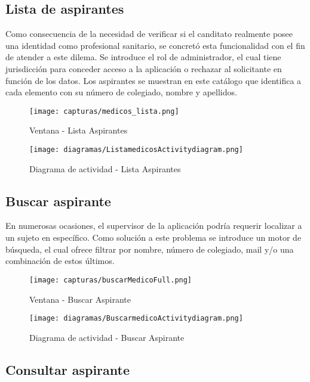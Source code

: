 \documentclass[11pt,spanish,
		listoftables,listoffigures]
		{tfgplantilla}
\begin{document}
\subsection {Lista de aspirantes}

Como consecuencia de la necesidad de verificar si el canditato realmente posee una identidad como profesional sanitario, se concretó esta funcionalidad con el fin de atender a este dilema. Se introduce el rol de administrador, el cual tiene jurisdicción para conceder acceso a la aplicación o rechazar al solicitante en función de los datos. Los aspirantes se muestran en este catálogo que identifica a cada elemento con su número de colegiado, nombre y apellidos.

\begin{figure}[H]
\centering
\texttt{[image: capturas/medicos\_lista.png]}
\caption{Ventana -  Lista Aspirantes}
\end{figure}

\begin{figure}[H]
\centering
\texttt{[image: diagramas/ListamedicosActivitydiagram.png]}
\caption{Diagrama de actividad -  Lista Aspirantes}
\end{figure}

\subsection {Buscar aspirante}

En numerosas ocasiones, el supervisor de la aplicación podría requerir localizar a un sujeto en específico. Como solución a este problema se introduce un motor de búsqueda, el cual ofrece filtrar por nombre, número de colegiado, mail y/o una combinación de estos últimos.

\begin{figure}[H]
\centering
\texttt{[image: capturas/buscarMedicoFull.png]}
\caption{Ventana -  Buscar Aspirante}
\end{figure}

\begin{figure}[H]
\centering
\texttt{[image: diagramas/BuscarmedicoActivitydiagram.png]}
\caption{Diagrama de actividad -  Buscar Aspirante}
\end{figure}

\subsection {Consultar aspirante}
\end{document}
